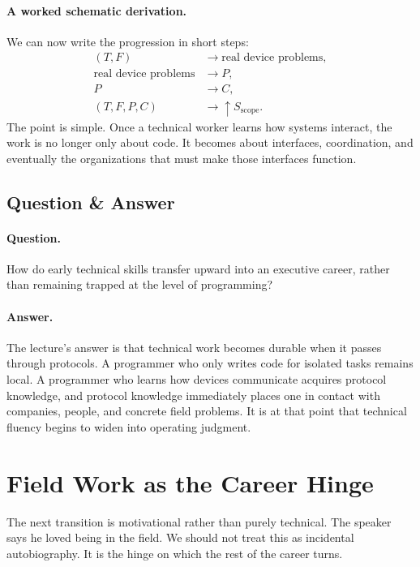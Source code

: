 \paragraph{A worked schematic derivation.}
We can now write the progression in short steps:
\begin{align}
(T,F) &\to \text{real device problems}, \\
\text{real device problems} &\to P, \\
P &\to C, \\
(T,F,P,C) &\to \uparrow S_{\text{scope}}.
\end{align}
The point is simple. Once a technical worker learns how systems interact, the work is no longer only about code. It becomes about interfaces, coordination, and eventually the organizations that must make those interfaces function.

\subsection{Question \& Answer}

\paragraph{Question.}
How do early technical skills transfer upward into an executive career, rather than remaining trapped at the level of programming?

\paragraph{Answer.}
The lecture's answer is that technical work becomes durable when it passes through protocols. A programmer who only writes code for isolated tasks remains local. A programmer who learns how devices communicate acquires protocol knowledge, and protocol knowledge immediately places one in contact with companies, people, and concrete field problems. It is at that point that technical fluency begins to widen into operating judgment.

\section{Field Work as the Career Hinge}

The next transition is motivational rather than purely technical. The speaker says he loved being in the field. We should not treat this as incidental autobiography. It is the hinge on which the rest of the career turns.

